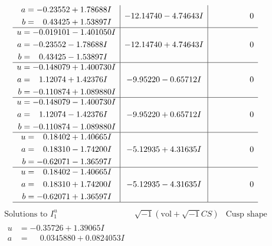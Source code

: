 \documentclass[1p]{elsarticle_modified}
\theoremstyle{definition}
\newcommand{\I}{\sqrt{-1}}
\begin{document}
$$\begin{array}{c|c|c}
\begin{aligned}
a &= -0.23552 + 1.78688 I \\
b &= \phantom{-}0.43425 + 1.53897 I\end{aligned}
 & -12.14740 - 4.74643 I & \phantom{-0.000000 } 0 \\ \hline\begin{aligned}
u &= -0.019101 - 1.401050 I \\
a &= -0.23552 - 1.78688 I \\
b &= \phantom{-}0.43425 - 1.53897 I\end{aligned}
 & -12.14740 + 4.74643 I & \phantom{-0.000000 } 0 \\ \hline\begin{aligned}
u &= -0.148079 + 1.400730 I \\
a &= \phantom{-}1.12074 + 1.42376 I \\
b &= -0.110874 + 1.089880 I\end{aligned}
 & -9.95220 - 0.65712 I & \phantom{-0.000000 } 0 \\ \hline\begin{aligned}
u &= -0.148079 - 1.400730 I \\
a &= \phantom{-}1.12074 - 1.42376 I \\
b &= -0.110874 - 1.089880 I\end{aligned}
 & -9.95220 + 0.65712 I & \phantom{-0.000000 } 0 \\ \hline\begin{aligned}
u &= \phantom{-}0.18402 + 1.40665 I \\
a &= \phantom{-}0.18310 - 1.74200 I \\
b &= -0.62071 - 1.36597 I\end{aligned}
 & -5.12935 + 4.31635 I & \phantom{-0.000000 } 0 \\ \hline\begin{aligned}
u &= \phantom{-}0.18402 - 1.40665 I \\
a &= \phantom{-}0.18310 + 1.74200 I \\
b &= -0.62071 + 1.36597 I\end{aligned}
 & -5.12935 - 4.31635 I & \phantom{-0.000000 } 0\\
 \hline 
 \end{array}$$\newpage$$\begin{array}{c|c|c}  
\text{Solutions to }I^u_{1}& \I (\text{vol} + \sqrt{-1}CS) & \text{Cusp shape}\\
 \hline 
\begin{aligned}
u &= -0.35726 + 1.39065 I \\
a &= \phantom{-}0.0345880 + 0.0824053 I \\

\end{aligned}
\end{array}$$
\end{document}
